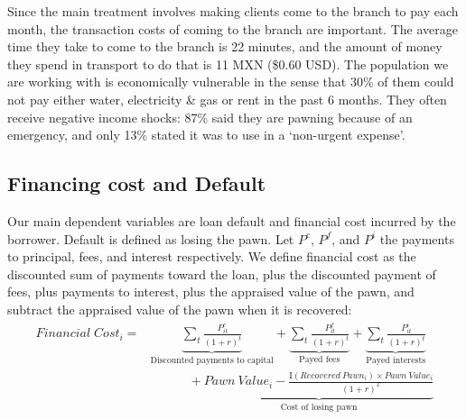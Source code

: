 \documentclass[oneside,11pt]{article}
\begin{document}
Since the main treatment involves making clients come to the branch to pay each month, the transaction costs of coming to the branch are important. The average time they take to come to the branch is 22 minutes, and the amount of money they spend in transport to do that is 11 MXN (\$0.60 USD).  
The population we are working with is economically vulnerable in the sense that 30\% of them could not pay either water, electricity \& gas or rent in the past 6 months. They often receive negative income shocks: 87\% said they are pawning because of an emergency, and only 13\% stated it was to use in a `non-urgent expense'.


\subsection{Financing cost and Default} \label{FC_def}

Our main dependent variables are loan default and financial cost incurred by the borrower. Default is defined as losing the pawn. Let $P^c$, $P^f$, and $P^i$ the payments to principal, fees, and interest respectively. We define financial cost as the discounted sum of payments toward the loan, plus the discounted payment of fees, plus payments to interest, plus the appraised value of the pawn, and subtract the appraised value of the pawn when it is recovered: 
\begin{align*}
    Financial \; Cost_i =& \underbrace{\sum_t \frac{P^c_{it}}{(1+r)^t}}_{\text{Discounted payments to capital}} + \underbrace{\sum_t \frac{P^f_{it}}{(1+r)^t}}_{\text{Payed fees}}  +\underbrace{\sum_t \frac{P^i_{it}}{(1+r)^t}}_{\text{Payed interests}} \\
    &\quad\qquad + \underbrace{Pawn \: Value_i - \frac{\text{I}(Recovered \: Pawn_i) \times Pawn \: Value_i}{(1+r)^T}}_{\text{Cost of losing pawn}}
\end{align*}
\end{document}
